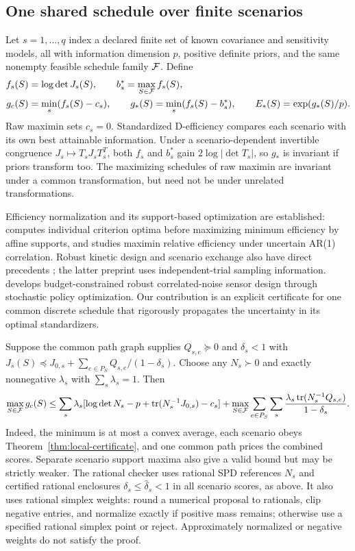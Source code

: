 \subsection{One shared schedule over finite scenarios}
\label{subsec:robust-certificate}
Let $s=1,\ldots,q$ index a declared finite set of known covariance and
sensitivity models, all with information dimension $p$, positive definite
priors, and the same nonempty feasible schedule family $\mathcal F$. Define
\begin{align}
 f_s(S)&=\log\det J_s(S),\qquad
 b_s^*=\max_{S\in\mathcal F}f_s(S),\nonumber\\
 g_c(S)&=\min_s(f_s(S)-c_s),\qquad
 g_*(S)=\min_s(f_s(S)-b_s^*),\qquad
 E_*(S)=\exp(g_*(S)/p).\label{eq:robust-objectives}
\end{align}
Raw maximin sets $c_s=0$. Standardized D-efficiency compares each scenario
with its own best attainable information. Under a scenario-dependent
invertible congruence $J_s\mapsto T_sJ_sT_s^T$, both $f_s$ and $b_s^*$
gain $2\log|\det T_s|$, so $g_*$ is invariant if priors transform too.
The maximizing schedules of raw maximin are invariant under a common
transformation, but need not be under unrelated transformations.

Efficiency normalization and its support-based optimization are established:
\citet[Section 3.2 of the preprint]{Burclova2016} computes individual
criterion optima before maximizing minimum efficiency by affine supports,
and \citet{Maus2010} studies maximin relative efficiency under uncertain
AR(1) correlation. Robust kinetic design and scenario exchange also have
direct precedents \citep{Duarte2018,WangYue2026}; the latter preprint uses
independent-trial sampling information. \citet{Chowdhary2025} develops
budget-constrained robust correlated-noise sensor design through stochastic
policy optimization. Our contribution is an explicit certificate for
one common discrete schedule that rigorously propagates the uncertainty in
its optimal standardizers.

Suppose the common path graph supplies $Q_{s,e}\succeq0$ and $\delta_s<1$
with $J_s(S)\preceq J_{0,s}+\sum_{e\in P_S}Q_{s,e}/(1-\delta_s)$.
Choose any $N_s\succ0$ and exactly nonnegative $\lambda_s$ with
$\sum_s\lambda_s=1$. Then
\begin{equation}\label{eq:robust-support}
 \max_{S\in\mathcal F}g_c(S)\le
 \sum_s\lambda_s[\log\det N_s-p+\operatorname{tr}(N_s^{-1}J_{0,s})-c_s]
 +\max_{S\in\mathcal F}\sum_{e\in P_S}\sum_s
 \frac{\lambda_s\operatorname{tr}(N_s^{-1}Q_{s,e})}{1-\delta_s}.
\end{equation}
Indeed, the minimum is at most a convex average, each scenario obeys
Theorem~\ref{thm:local-certificate}, and one common path prices the combined
scores. Separate scenario support maxima also give a valid bound but may
be strictly weaker. The rational checker uses rational SPD references $N_s$
and certified rational enclosures $\delta_s\le\widehat\delta_s<1$ in all
scenario scores, as above. It also uses rational simplex weights: round a
numerical proposal to rationals, clip negative entries, and normalize exactly
if positive mass remains; otherwise use a specified rational simplex point
or reject. Approximately normalized or negative weights do not satisfy the
proof.

